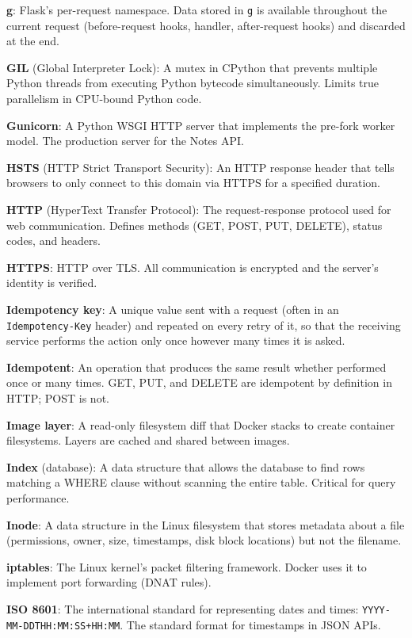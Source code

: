 \textbf{g}: Flask's per-request namespace. Data stored in \texttt{g} is available throughout the current request (before-request hooks, handler, after-request hooks) and discarded at the end.

\textbf{GIL} (Global Interpreter Lock): A mutex in CPython that prevents multiple Python threads from executing Python bytecode simultaneously. Limits true parallelism in CPU-bound Python code.

\textbf{Gunicorn}: A Python WSGI HTTP server that implements the pre-fork worker model. The production server for the Notes API.

\textbf{HSTS} (HTTP Strict Transport Security): An HTTP response header that tells browsers to only connect to this domain via HTTPS for a specified duration.

\textbf{HTTP} (HyperText Transfer Protocol): The request-response protocol used for web communication. Defines methods (GET, POST, PUT, DELETE), status codes, and headers.

\textbf{HTTPS}: HTTP over TLS. All communication is encrypted and the server's identity is verified.

\textbf{Idempotency key}: A unique value sent with a request (often in an \texttt{Idempotency-Key} header) and repeated on every retry of it, so that the receiving service performs the action only once however many times it is asked.

\textbf{Idempotent}: An operation that produces the same result whether performed once or many times. GET, PUT, and DELETE are idempotent by definition in HTTP; POST is not.

\textbf{Image layer}: A read-only filesystem diff that Docker stacks to create container filesystems. Layers are cached and shared between images.

\textbf{Index} (database): A data structure that allows the database to find rows matching a WHERE clause without scanning the entire table. Critical for query performance.

\textbf{Inode}: A data structure in the Linux filesystem that stores metadata about a file (permissions, owner, size, timestamps, disk block locations) but not the filename.

\textbf{iptables}: The Linux kernel's packet filtering framework. Docker uses it to implement port forwarding (DNAT rules).

\textbf{ISO 8601}: The international standard for representing dates and times: \texttt{YYYY-}\allowbreak{}\texttt{MM-}\allowbreak{}\texttt{DDTHH:}\allowbreak{}\texttt{MM:}\allowbreak{}\texttt{SS+HH:}\allowbreak{}\texttt{MM}. The standard format for timestamps in JSON APIs.

